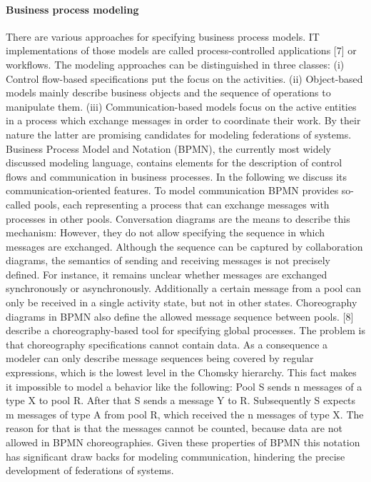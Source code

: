 \paragraph{Business process modeling}
There are various approaches for specifying business process models. IT implementations of those models are called process-controlled applications [7] or workflows. The modeling approaches can be distinguished in three classes: (i) Control flow-based specifications put the focus on the activities. (ii) Object-based models mainly describe business objects and the sequence of operations to manipulate them. (iii) Communication-based models focus on the active entities in a process which exchange messages in order to coordinate their work.
By their nature the latter are promising candidates for modeling federations of systems. Business Process Model and Notation (BPMN), the currently most widely discussed modeling language, contains elements for the description of control flows and communication in business processes. In the following we discuss its communication-oriented features.
To model communication BPMN provides so-called pools, each representing a process that can exchange messages with processes in other pools. Conversation diagrams are the means to describe this mechanism: However, they do not allow specifying the sequence in which messages are exchanged. Although the sequence can be captured by collaboration diagrams, the semantics of sending and receiving messages is not precisely defined. For instance, it remains unclear whether messages are exchanged synchronously or asynchronously. Additionally a certain message from a pool can only be received in a single activity state, but not in other states. Choreography diagrams in BPMN also define the allowed message sequence between pools. [8] describe a choreography-based tool for specifying global processes. The problem is that choreography specifications cannot contain data. As a consequence a modeler can only describe message sequences being covered by regular expressions, which is the lowest level in the Chomsky hierarchy. This fact makes it impossible to model a behavior like the following: Pool S sends n messages of a type X to pool R. After that S sends a message Y to R. Subsequently S expects m messages of type A from pool R, which received the n messages of type X. The reason for that is that the messages cannot be counted, because data are not allowed in BPMN choreographies.
Given these properties of BPMN this notation has significant draw backs for modeling communication, hindering the precise development of federations of systems.

